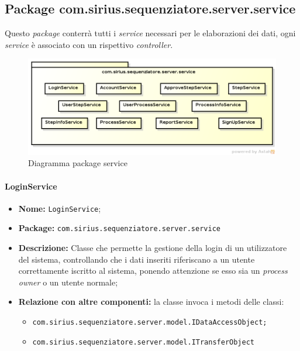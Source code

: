 \subsection{Package com.sirius.sequenziatore.server.service}
Questo \textit{package} conterrà tutti i \textit{service} necessari per le elaborazioni dei dati, ogni \textit{service} è associato con un rispettivo \textit{controller}.
\begin{figure}[H] \centering \includegraphics[width=%
\textwidth]
{./pack/serverService.png} \caption{Diagramma package service}
\end{figure}
\paragraph{LoginService}
	\begin{itemize}
		\item \textbf{Nome:} \texttt{LoginService};
		\item \textbf{Package:} \texttt{com.sirius.sequenziatore.server.service}
		\item \textbf{Descrizione:} Classe che permette la gestione della login di un utilizzatore del sistema, controllando che i dati inseriti riferiscano a un utente correttamente iscritto al sistema, ponendo attenzione se esso sia un \textit{process owner} o un utente normale;
		\item \textbf{Relazione con altre componenti:} la classe invoca i metodi delle classi:
		\begin{itemize}
			\item \texttt{com.sirius.sequenziatore.server.model.IDataAccessObject;}
			\item \texttt{com.sirius.sequenziatore.server.model.ITransferObject}
		\end{itemize}
	\end{itemize}

